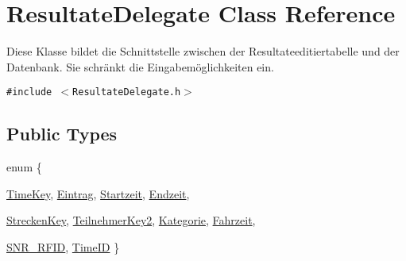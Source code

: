\hypertarget{class_resultate_delegate}{
\section{ResultateDelegate Class Reference}
\label{class_resultate_delegate}
}
Diese Klasse bildet die Schnittstelle zwischen der Resultateeditiertabelle und der Datenbank. Sie schränkt die Eingabemöglichkeiten ein.  


{\tt \#include $<$ResultateDelegate.h$>$}

\subsection*{Public Types}
\begin{CompactItemize}
\item 
enum \{ \par
\hyperlink{class_resultate_delegate_cef2aa28999e59742b93b9a8774516963bc6397929f5f2f6d0a35295cafb2614}{TimeKey}, 
\hyperlink{class_resultate_delegate_cef2aa28999e59742b93b9a87745169605db24fd1f47cc14ca301b6f37a1565e}{Eintrag}, 
\hyperlink{class_resultate_delegate_cef2aa28999e59742b93b9a877451696896b8c90061da1c9abba99193c4d64e0}{Startzeit}, 
\hyperlink{class_resultate_delegate_cef2aa28999e59742b93b9a87745169620732dcb13192649e836ef44c64679c7}{Endzeit}, 
\par
\hyperlink{class_resultate_delegate_cef2aa28999e59742b93b9a8774516964cf54f9bba6ed5955c505a52099d5af2}{StreckenKey}, 
\hyperlink{class_resultate_delegate_cef2aa28999e59742b93b9a877451696b98fff8564c80d289708ea3a28e4ed15}{TeilnehmerKey2}, 
\hyperlink{class_resultate_delegate_cef2aa28999e59742b93b9a877451696d15aede73b5491d1b1767c60d4120969}{Kategorie}, 
\hyperlink{class_resultate_delegate_cef2aa28999e59742b93b9a877451696f49c1d5ed4b5d962fa935b3b065ea083}{Fahrzeit}, 
\par
\hyperlink{class_resultate_delegate_cef2aa28999e59742b93b9a8774516966cc87a8e8f7476fb00292b3aa581a3f4}{SNR\_\-RFID}, 
\hyperlink{class_resultate_delegate_cef2aa28999e59742b93b9a877451696d030167b37a6f4a3f6a925805b25f3cb}{TimeID}
 \}
\end{CompactItemize}
